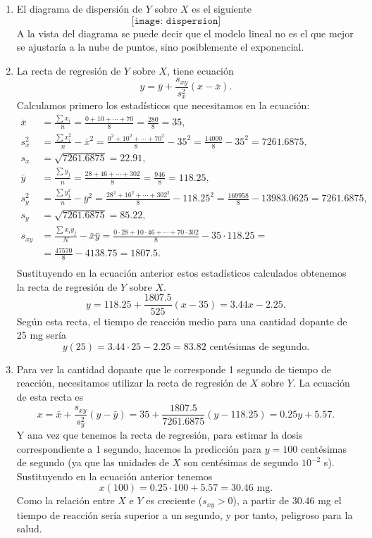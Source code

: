 {\begin{enumerate}
\item El diagrama de dispersión de $Y$ sobre $X$ es el siguiente
\[
\texttt{[image: dispersion]}\qquad
\]
A la vista del diagrama se puede decir que el modelo lineal no es el que mejor se ajustaría a la nube de puntos, sino posiblemente el exponencial.

\item La recta de regresión de $Y$ sobre $X$, tiene ecuación
\[
y=\bar y+\frac{s_{xy}}{s_{x}^2}(x-\bar x).
\]
Calculamos primero los estadísticos que necesitamos en la ecuación:
\begin{align*}
\bar x & = \frac{\sum x_{i}}{n}=\frac{0+10+\cdots+70}{8}=\frac{280}{8}=35,  \\
s_{x}^2 & = \frac{\sum x_{i}^2}{n}-\bar x^2 = \frac{0^2+10^2+\cdots+70^2}{8}-35^2=\frac{14000}{8}-35^2=7261.6875,  \\
s_{x} & = \sqrt{7261.6875}=22.91,  \\
\bar y & = \frac{\sum y_{j}}{n}=\frac{28+46+\cdots+302}{8}= \frac{946}{8}=118.25,  \\
s_{y}^2 & = \frac{\sum y_{j}^2}{n}-\bar y^2 = \frac{28^2+16^2+\cdots+302^2}{8}-118.25^2=\frac{169958}{8}-13983.0625=7261.6875,  \\
s_{y} & = \sqrt{7261.6875}=85.22,  \\
s_{xy} & = \frac{\sum x_{i}y_{j}}{N}-\bar x\bar y = \frac{0\cdot 28+10\cdot 46+\cdots +70\cdot 302}{8}-35\cdot 118.25 =\\
& = \frac{47570}{8}-4138.75=1807.5.  \\
\end{align*}
Sustituyendo en la ecuación anterior estos estadísticos calculados obtenemos la recta de regresión de $Y$ sobre $X$.
\[
y=118.25+\frac{1807.5}{525}(x-35)=3.44x-2.25.
\]
Según esta recta, el tiempo de reacción medio para una cantidad dopante de 25 mg sería
\[
y(25)=3.44\cdot 25-2.25=83.82 \textrm{ centésimas de segundo}.
\]

\item Para ver la cantidad dopante que le corresponde 1 segundo de tiempo de reacción, necesitamos utilizar la recta de regresión de $X$ sobre $Y$. La ecuación de esta recta es
\[
x=\bar x+\frac{s_{xy}}{s_{y}^2}(y-\bar y)= 35+\frac{1807.5}{7261.6875}(y-118.25)=0.25y+5.57.
\]
Y ana vez que tenemos la recta de regresión, para estimar la dosis correspondiente a 1 segundo, hacemos la predicción para $y=100$ centésimas de segundo (ya que las unidades de $X$ son centésimas de segundo $10^{-2}$ s). Sustituyendo en la ecuación anterior tenemos
\[ x(100)=0.25\cdot 100+5.57=30.46 \textrm{ mg}. \]
Como la relación entre $X$ e $Y$ es creciente ($s_{xy}>0$), a partir de $30.46$ mg el tiempo de reacción sería superior a un segundo, y por tanto, peligroso para la salud.
\end{enumerate}
}


